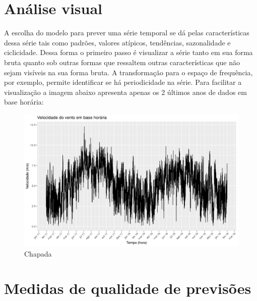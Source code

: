\documentclass[
	12pt,				%
	openright,			%
	oneside,			%
	a4paper,			%
	english,			%
	french,				%
	spanish,			%
	brazil				%
	]{abntex2}
\begin{document}
\section{Análise visual}

A escolha do modelo para prever uma série temporal se dá pelas características dessa série tais como padrões, valores atípicos, tendências, sazonalidade e ciclicidade. Dessa forma o primeiro passo é visualizar a série tanto em sua forma bruta quanto sob outras formas que ressaltem outras características que não sejam visíveis na sua forma bruta. A transformação para o espaço de frequência, por exemplo, permite identificar se há periodicidade na série. Para facilitar a visualização a imagem abaixo apresenta apenas os 2 últimos anos de dados em base horária:

\begin{figure}[h]
    \centering
	\includegraphics[width=\textwidth]{entire_series_hourly_basis}
	\caption{Chapada}
\end{figure}
\FloatBarrier



\section{Medidas de qualidade de previsões}
\end{document}
